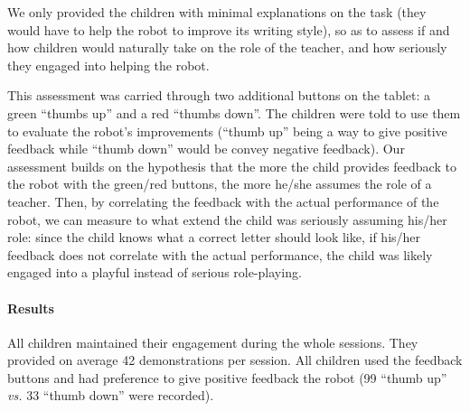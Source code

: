 \documentclass{article}
\newcommand{\vs}{\textit{vs.}\xspace}
\begin{document}
We only provided the children with minimal explanations on the task (they would
have to help the robot to improve its writing style), so as to assess if and how
children would naturally take on the role of the teacher, and how seriously they
engaged into helping the robot.

This assessment was carried through two additional buttons on the tablet: a
green ``thumbs up'' and a red ``thumbs down''. The children were told to use
them to evaluate the robot's improvements (``thumb up'' being a way to give
positive feedback while ``thumb down'' would be convey negative feedback). Our
assessment builds on the hypothesis that the more the child provides feedback to
the robot with the green/red buttons, the more he/she assumes the role of a
teacher. Then, by correlating the feedback with the actual performance of the
robot, we can measure to what extend the child was seriously assuming his/her
role: since the child knows what a correct letter should look like, if his/her
feedback does not correlate with the actual performance, the child was likely
engaged into a playful instead of serious role-playing.


\paragraph{Results}

All children maintained their engagement during the whole sessions. They
provided on average 42 demonstrations per session. All children used the
feedback buttons and had preference to give positive feedback the robot (99
``thumb up'' \vs 33 ``thumb down'' were recorded). 
\end{document}
